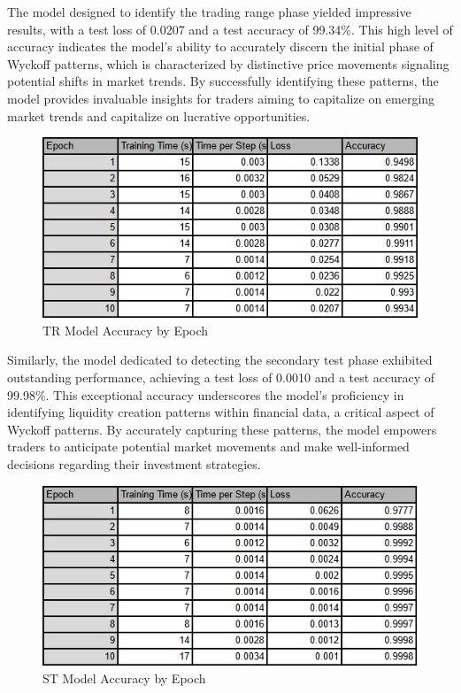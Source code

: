 \documentclass{article}
\begin{document}
The model designed to identify the trading range phase yielded impressive results, with a test loss of 0.0207 and a test accuracy of 99.34\%. This high level of accuracy indicates the model's ability to accurately discern the initial phase of Wyckoff patterns, which is characterized by distinctive price movements signaling potential shifts in market trends. By successfully identifying these patterns, the model provides invaluable insights for traders aiming to capitalize on emerging market trends and capitalize on lucrative opportunities.

\begin{figure}[ht]
	\centering
	\includegraphics[width=0.6\linewidth]{visuals/tr_acc}
	\caption{TR Model Accuracy by Epoch}
	\label{fig:tracc}
\end{figure}


Similarly, the model dedicated to detecting the secondary test phase exhibited outstanding performance, achieving a test loss of 0.0010 and a test accuracy of 99.98\%. This exceptional accuracy underscores the model's proficiency in identifying liquidity creation patterns within financial data, a critical aspect of Wyckoff patterns. By accurately capturing these patterns, the model empowers traders to anticipate potential market movements and make well-informed decisions regarding their investment strategies.

\begin{figure}[ht]
	\centering
	\includegraphics[width=0.6\linewidth]{visuals/st_acc}
	\caption{ST Model Accuracy by Epoch}
	\label{fig:stacc}
\end{figure}
\end{document}
